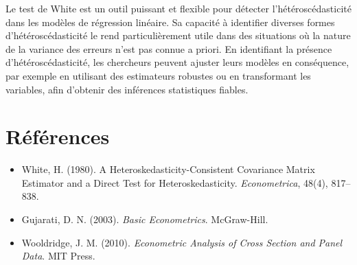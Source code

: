 \documentclass[14pt]{extarticle} %
\theoremstyle{definition}
\theoremstyle{plain}
\begin{document}
Le test de White est un outil puissant et flexible pour détecter l'hétéroscédasticité dans les modèles de régression linéaire. Sa capacité à identifier diverses formes d'hétéroscédasticité le rend particulièrement utile dans des situations où la nature de la variance des erreurs n'est pas connue a priori. En identifiant la présence d'hétéroscédasticité, les chercheurs peuvent ajuster leurs modèles en conséquence, par exemple en utilisant des estimateurs robustes ou en transformant les variables, afin d'obtenir des inférences statistiques fiables.

\section{Références}

\begin{itemize}
    \item White, H. (1980). A Heteroskedasticity-Consistent Covariance Matrix Estimator and a Direct Test for Heteroskedasticity. \textit{Econometrica}, 48(4), 817–838.
    \item Gujarati, D. N. (2003). \textit{Basic Econometrics}. McGraw-Hill.
    \item Wooldridge, J. M. (2010). \textit{Econometric Analysis of Cross Section and Panel Data}. MIT Press.
\end{itemize}
\end{document}
